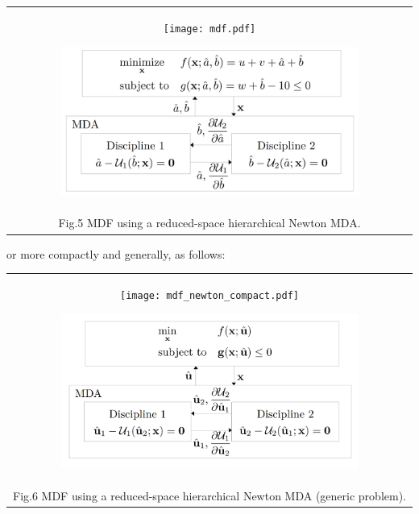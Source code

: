 \documentclass[11pt]{article}
\begin{document}
\begin{longtable}[]{@{}c@{}}
    \toprule
    \endhead
    \begin{minipage}[t]{0.97\columnwidth}\centering
        \begin{figure}
            \centering
            \texttt{[image: mdf.pdf]}
        \end{figure}
        \begin{figure}
            \centering
            \includegraphics[width=0.9\textwidth]{images/MDF_diagram_numerical.png}
        \end{figure}
    \end{minipage}\tabularnewline
    Fig.5 MDF using a reduced-space hierarchical Newton MDA.\tabularnewline
    \bottomrule
\end{longtable}

or more compactly and generally, as follows:

\begin{longtable}[]{@{}c@{}}
    \toprule
    \endhead
    \begin{minipage}[t]{0.97\columnwidth}\centering
        \begin{figure}
            \centering
            \texttt{[image: mdf\_newton\_compact.pdf]}
        \end{figure}
        \begin{figure}
            \centering
            \includegraphics[width=0.9\textwidth]{images/MDF_diagram_newton.png}
        \end{figure}
    \end{minipage}\tabularnewline
    Fig.6 MDF using a reduced-space hierarchical Newton MDA (generic problem).\tabularnewline
    \bottomrule
\end{longtable}
\end{document}
